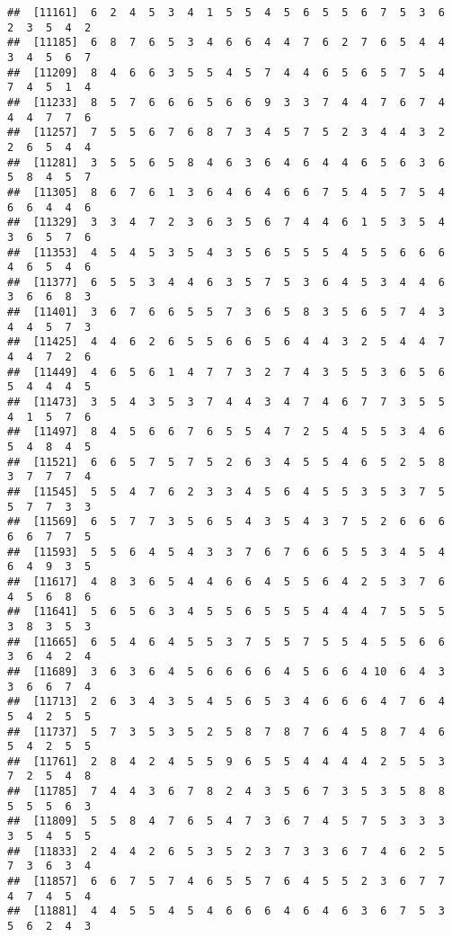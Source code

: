 \documentclass[
]{book}
\begin{document}
\begin{verbatim}
##  [11161]  6  2  4  5  3  4  1  5  5  4  5  6  5  5  6  7  5  3  6  2  3  5  4  2
##  [11185]  6  8  7  6  5  3  4  6  6  4  4  7  6  2  7  6  5  4  4  3  4  5  6  7
##  [11209]  8  4  6  6  3  5  5  4  5  7  4  4  6  5  6  5  7  5  4  7  4  5  1  4
##  [11233]  8  5  7  6  6  6  5  6  6  9  3  3  7  4  4  7  6  7  4  4  4  7  7  6
##  [11257]  7  5  5  6  7  6  8  7  3  4  5  7  5  2  3  4  4  3  2  2  6  5  4  4
##  [11281]  3  5  5  6  5  8  4  6  3  6  4  6  4  4  6  5  6  3  6  5  8  4  5  7
##  [11305]  8  6  7  6  1  3  6  4  6  4  6  6  7  5  4  5  7  5  4  6  6  4  4  6
##  [11329]  3  3  4  7  2  3  6  3  5  6  7  4  4  6  1  5  3  5  4  3  6  5  7  6
##  [11353]  4  5  4  5  3  5  4  3  5  6  5  5  5  4  5  5  6  6  6  4  6  5  4  6
##  [11377]  6  5  5  3  4  4  6  3  5  7  5  3  6  4  5  3  4  4  6  3  6  6  8  3
##  [11401]  3  6  7  6  6  5  5  7  3  6  5  8  3  5  6  5  7  4  3  4  4  5  7  3
##  [11425]  4  4  6  2  6  5  5  6  6  5  6  4  4  3  2  5  4  4  7  4  4  7  2  6
##  [11449]  4  6  5  6  1  4  7  7  3  2  7  4  3  5  5  3  6  5  6  5  4  4  4  5
##  [11473]  3  5  4  3  5  3  7  4  4  3  4  7  4  6  7  7  3  5  5  4  1  5  7  6
##  [11497]  8  4  5  6  6  7  6  5  5  4  7  2  5  4  5  5  3  4  6  5  4  8  4  5
##  [11521]  6  6  5  7  5  7  5  2  6  3  4  5  5  4  6  5  2  5  8  3  7  7  7  4
##  [11545]  5  5  4  7  6  2  3  3  4  5  6  4  5  5  3  5  3  7  5  5  7  7  3  3
##  [11569]  6  5  7  7  3  5  6  5  4  3  5  4  3  7  5  2  6  6  6  6  6  7  7  5
##  [11593]  5  5  6  4  5  4  3  3  7  6  7  6  6  5  5  3  4  5  4  6  4  9  3  5
##  [11617]  4  8  3  6  5  4  4  6  6  4  5  5  6  4  2  5  3  7  6  4  5  6  8  6
##  [11641]  5  6  5  6  3  4  5  5  6  5  5  5  4  4  4  7  5  5  5  3  8  3  5  3
##  [11665]  6  5  4  6  4  5  5  3  7  5  5  7  5  5  4  5  5  6  6  3  6  4  2  4
##  [11689]  3  6  3  6  4  5  6  6  6  6  4  5  6  6  4 10  6  4  3  3  6  6  7  4
##  [11713]  2  6  3  4  3  5  4  5  6  5  3  4  6  6  6  4  7  6  4  5  4  2  5  5
##  [11737]  5  7  3  5  3  5  2  5  8  7  8  7  6  4  5  8  7  4  6  5  4  2  5  5
##  [11761]  2  8  4  2  4  5  5  9  6  5  5  4  4  4  4  2  5  5  3  7  2  5  4  8
##  [11785]  7  4  4  3  6  7  8  2  4  3  5  6  7  3  5  3  5  8  8  5  5  5  6  3
##  [11809]  5  5  8  4  7  6  5  4  7  3  6  7  4  5  7  5  3  3  3  3  5  4  5  5
##  [11833]  2  4  4  2  6  5  3  5  2  3  7  3  3  6  7  4  6  2  5  7  3  6  3  4
##  [11857]  6  6  7  5  7  4  6  5  5  7  6  4  5  5  2  3  6  7  7  4  7  4  5  4
##  [11881]  4  4  5  5  4  5  4  6  6  6  4  6  4  6  3  6  7  5  3  5  6  2  4  3

\end{verbatim}
\end{document}
